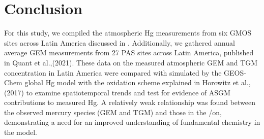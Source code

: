 \section{Conclusion}

\begin{flushleft}
For this study, we compiled the atmospheric Hg measurements from six GMOS sites across Latin America discussed in \cite{koenig_seasonal_2021,sprovieri_atmospheric_2016}. Additionally, we gathered annual average GEM measurements from 27 PAS sites across Latin America, published in Quant et al.,(2021). These data on the measured atmospheric GEM and TGM concentration in Latin America were compared with \hgc simulated by the GEOS-Chem global Hg model with the oxidation scheme explained in Horowitz et al.,(2017) to examine spatiotemporal trends and test for evidence of ASGM contributions to measured Hg. A relatively weak relationship was found between the observed mercury species (GEM and TGM) and those in the /on, demonstrating a need for an improved understanding of fundamental chemistry in the \gc model.

\end{flushleft}